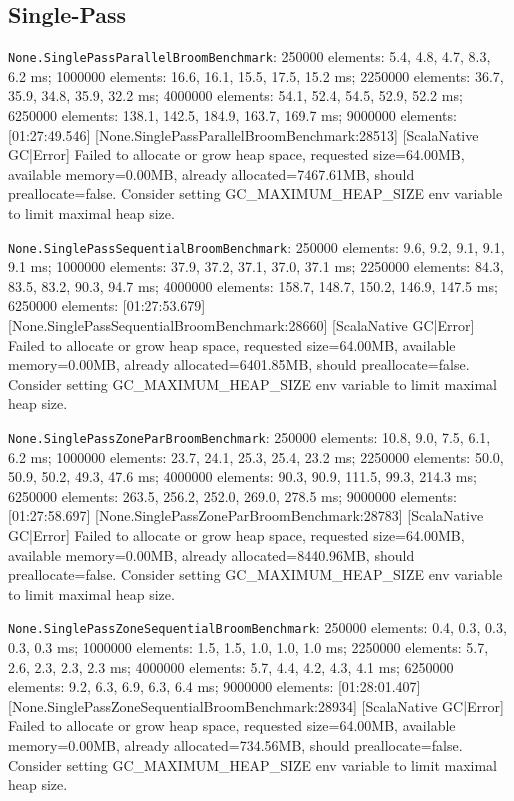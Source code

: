 \documentclass[
  english,   %
  bibtex,    %
]{kththesis}
\begin{document}
\subsection{Single-Pass}

\texttt{None.SinglePassParallelBroomBenchmark}: 250000 elements: 5.4, 4.8, 4.7,
8.3, 6.2 ms; 1000000 elements: 16.6, 16.1, 15.5, 17.5, 15.2 ms; 2250000
elements: 36.7, 35.9, 34.8, 35.9, 32.2 ms; 4000000 elements: 54.1, 52.4, 54.5,
52.9, 52.2 ms; 6250000 elements: 138.1, 142.5, 184.9, 163.7, 169.7 ms;
9000000 elements: [01:27:49.546] [None.SinglePassParallelBroomBenchmark:28513] [ScalaNative GC|Error] Failed to allocate or grow heap space, requested size=64.00MB, available memory=0.00MB, already allocated=7467.61MB, should preallocate=false. Consider setting GC_MAXIMUM_HEAP_SIZE env variable to limit maximal heap size.

\texttt{None.SinglePassSequentialBroomBenchmark}: 250000 elements: 9.6, 9.2,
9.1, 9.1, 9.1 ms; 1000000 elements: 37.9, 37.2, 37.1, 37.0, 37.1 ms; 2250000
elements: 84.3, 83.5, 83.2, 90.3, 94.7 ms; 4000000 elements: 158.7, 148.7,
150.2, 146.9, 147.5 ms; 6250000 elements: [01:27:53.679] [None.SinglePassSequentialBroomBenchmark:28660] [ScalaNative GC|Error] Failed to allocate or grow heap space, requested size=64.00MB, available memory=0.00MB, already allocated=6401.85MB, should preallocate=false. Consider setting GC_MAXIMUM_HEAP_SIZE env variable to limit maximal heap size.

\texttt{None.SinglePassZoneParBroomBenchmark}: 250000 elements: 10.8, 9.0, 7.5,
6.1, 6.2 ms; 1000000 elements: 23.7, 24.1, 25.3, 25.4, 23.2 ms; 2250000
elements: 50.0, 50.9, 50.2, 49.3, 47.6 ms; 4000000 elements: 90.3, 90.9,
111.5, 99.3, 214.3 ms; 6250000 elements: 263.5, 256.2, 252.0, 269.0, 278.5
ms; 9000000 elements: [01:27:58.697] [None.SinglePassZoneParBroomBenchmark:28783] [ScalaNative GC|Error] Failed to allocate or grow heap space, requested size=64.00MB, available memory=0.00MB, already allocated=8440.96MB, should preallocate=false. Consider setting GC_MAXIMUM_HEAP_SIZE env variable to limit maximal heap size.

\texttt{None.SinglePassZoneSequentialBroomBenchmark}: 250000 elements: 0.4,
0.3, 0.3, 0.3, 0.3 ms; 1000000 elements: 1.5, 1.5, 1.0, 1.0, 1.0 ms; 2250000
elements: 5.7, 2.6, 2.3, 2.3, 2.3 ms; 4000000 elements: 5.7, 4.4, 4.2, 4.3,
4.1 ms; 6250000 elements: 9.2, 6.3, 6.9, 6.3, 6.4 ms; 9000000 elements:
[01:28:01.407] [None.SinglePassZoneSequentialBroomBenchmark:28934] [ScalaNative GC|Error] Failed to allocate or grow heap space, requested size=64.00MB, available memory=0.00MB, already allocated=734.56MB, should preallocate=false. Consider setting GC_MAXIMUM_HEAP_SIZE env variable to limit maximal heap size.
\end{document}
